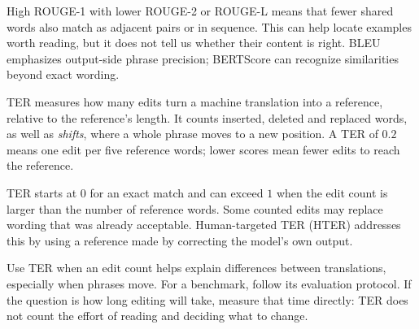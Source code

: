 \metricsecondary

High ROUGE-1 with lower ROUGE-2 or ROUGE-L means that fewer shared words also match as adjacent pairs
or in sequence. This can help locate examples worth reading, but it does not tell us whether their
content is right. BLEU emphasizes output-side phrase precision; BERTScore can recognize similarities
beyond exact wording.

\metricend
\clearpage
\thispagestyle{nlpstyle}
\label{sec:ter}

TER measures how many edits turn a machine translation into a reference, relative to the reference's
length. It counts inserted, deleted and replaced words, as well as \textit{shifts}, where a whole phrase
moves to a new position. A TER of $0.2$ means one edit per five reference words; lower scores mean
fewer edits to reach the reference.

\begin{metricformula}
\end{metricformula}

TER starts at $0$ for an exact match and can exceed $1$ when the edit count is larger than the number
of reference words. Some counted edits may replace wording that was already acceptable. Human-targeted
TER (HTER) addresses this by using a reference made by correcting the model's own output.


Use TER when an edit count helps explain differences between translations, especially when phrases
move. For a benchmark, follow its evaluation protocol. If the question is how long editing will take,
measure that time directly: TER does not count the effort of reading and deciding what to change.


